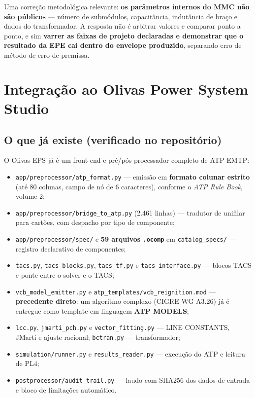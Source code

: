 \documentclass[12pt,a4paper]{article}
\newcommand{\arq}[1]{\texttt{\small #1}}
\begin{document}
Uma correção metodológica relevante: \textbf{os parâmetros internos do MMC não são públicos} ---
número de submódulos, capacitância, indutância de braço e dados do transformador. A resposta não é
arbitrar valores e comparar ponto a ponto, e sim \textbf{varrer as faixas de projeto declaradas e
demonstrar que o resultado da EPE cai dentro do envelope produzido}, separando erro de método de erro
de premissa.

\section{Integração ao Olivas Power System Studio}
\label{sec:integracao}

\subsection{O que já existe (verificado no repositório)}

O Olivas EPS já é um front-end e pré/pós-processador completo de ATP-EMTP:

\begin{itemize}
  \item \arq{app/preprocessor/atp\_format.py} --- emissão em \textbf{formato colunar estrito}
        (até 80 colunas, campo de nó de 6 caracteres), conforme o \emph{ATP Rule Book}, volume 2;
  \item \arq{app/preprocessor/bridge\_to\_atp.py} (2.461 linhas) --- tradutor de unifilar para
        cartões, com despacho por tipo de componente;
  \item \arq{app/preprocessor/spec/} e \textbf{59 arquivos \arq{.ocomp}} em \arq{catalog\_specs/}
        --- registro declarativo de componentes;
  \item \arq{tacs.py}, \arq{tacs\_blocks.py}, \arq{tacs\_tf.py} e \arq{tacs\_interface.py} ---
        blocos TACS e ponte entre o solver e o TACS;
  \item \arq{vcb\_model\_emitter.py} e \arq{atp\_templates/vcb\_reignition.mod} ---
        \textbf{precedente direto}: um algoritmo complexo (CIGRE WG A3.26) já é entregue como
        template em linguagem \textbf{ATP MODELS};
  \item \arq{lcc.py}, \arq{jmarti\_pch.py} e \arq{vector\_fitting.py} --- LINE CONSTANTS, JMarti e
        ajuste racional; \arq{bctran.py} --- transformador;
  \item \arq{simulation/runner.py} e \arq{results\_reader.py} --- execução do ATP e leitura de PL4;
  \item \arq{postprocessor/audit\_trail.py} --- laudo com SHA256 dos dados de entrada e bloco de
        limitações automático.
\end{itemize}
\end{document}
